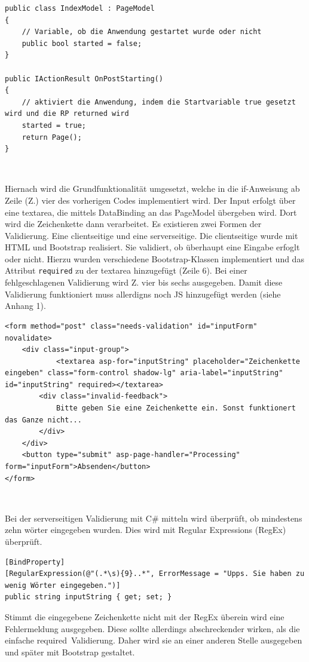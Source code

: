 \documentclass[a4paper,
12pt,
oneside]
{article}
\newcommand{\sPar}{\par\vspace*{6pt}}
\begin{document}
	\lstset{style=csharp}
	\begin{lstlisting}
public class IndexModel : PageModel
{
	// Variable, ob die Anwendung gestartet wurde oder nicht
	public bool started = false;
}

public IActionResult OnPostStarting()
{
	// aktiviert die Anwendung, indem die Startvariable true gesetzt wird und die RP returned wird
	started = true;
	return Page();
}
	\end{lstlisting} ~\sPar
	Hiernach wird die Grundfunktionalität umgesetzt, welche in die if-Anweisung ab Zeile (Z.) vier des vorherigen Codes implementiert wird. Der Input erfolgt über eine textarea, die mittels DataBinding an das PageModel übergeben wird. Dort wird die Zeichenkette dann verarbeitet. Es existieren zwei Formen der Validierung. Eine clientseitige und eine serverseitige. Die clientseitige wurde mit HTML und Bootstrap realisiert. Sie validiert, ob überhaupt eine Eingabe erfoglt oder nicht. Hierzu wurden verschiedene Bootstrap-Klassen implementiert und das Attribut \texttt{required} zu der textarea hinzugefügt (Zeile 6). Bei einer fehlgeschlagenen Validierung wird Z. vier bis sechs ausgegeben. Damit diese Validierung funktioniert muss allerdigns noch JS hinzugefügt werden (siehe Anhang 1).
	\lstset{style=csharp}
	\begin{lstlisting}
<form method="post" class="needs-validation" id="inputForm" novalidate>
	<div class="input-group">
			<textarea asp-for="inputString" placeholder="Zeichenkette eingeben" class="form-control shadow-lg" aria-label="inputString" id="inputString" required></textarea>
		<div class="invalid-feedback">
			Bitte geben Sie eine Zeichenkette ein. Sonst funktionert das Ganze nicht...
		</div>
	</div>
	<button type="submit" asp-page-handler="Processing" form="inputForm">Absenden</button>
</form>
	\end{lstlisting} ~\sPar
	Bei der serverseitigen Validierung mit C\# mitteln wird überprüft, ob mindestens zehn wörter eingegeben wurden. Dies wird mit Regular Expressions (RegEx) überprüft. 
	\lstset{style=csharp}
	\begin{lstlisting}
[BindProperty]
[RegularExpression(@"(.*\s){9}..*", ErrorMessage = "Upps. Sie haben zu wenig Wörter eingegeben.")]
public string inputString { get; set; }
	\end{lstlisting}
	Stimmt die eingegebene Zeichenkette nicht mit der RegEx überein wird eine Fehlermeldung ausgegeben. Diese sollte allerdings abschreckender wirken, als die einfache \glqq required\grqq~Validierung. Daher wird sie an einer anderen Stelle ausgegeben und später mit Bootstrap gestaltet.
\end{document}

